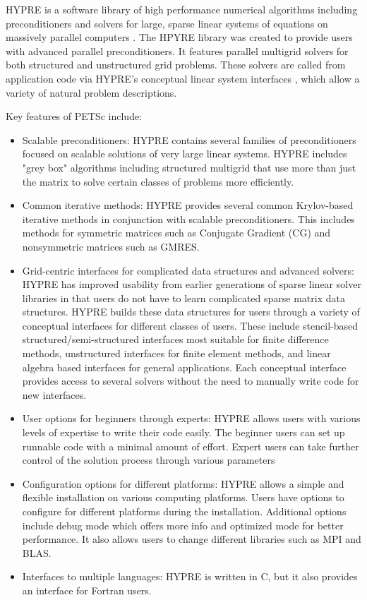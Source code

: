 HYPRE is a software library of high performance numerical algorithms including preconditioners and solvers for large, sparse linear systems of equations on massively parallel computers \cite{Falgout2006TheDA}. 
The HPYRE library was created to provide users with advanced parallel preconditioners. It features parallel multigrid solvers for both structured and unstructured grid problems.
These solvers are called from application code via HYPRE's conceptual linear system interfaces \cite{10.5555/1125403.1125423}, which allow a variety of natural problem descriptions.

Key features of PETSc include:
\begin{itemize}
    \item Scalable preconditioners: HYPRE contains several families of preconditioners focused on scalable solutions of very large linear systems.
    HYPRE includes "grey box" algorithms including structured multigrid that use more than just the matrix to solve certain classes of problems more efficiently.
    \item Common iterative methods: HYPRE provides several common Krylov-based iterative methods in conjunction with scalable preconditioners. 
    This includes methods for symmetric matrices such as Conjugate Gradient (CG) and nonsymmetric matrices such as GMRES.
    \item Grid-centric interfaces for complicated data structures and advanced solvers: HYPRE has improved usability from earlier generations of sparse linear solver libraries in that users do not have to learn complicated sparse matrix data structures.
    HYPRE builds these data structures for users through a variety of conceptual interfaces for different classes of users.
    These include stencil-based structured/semi-structured interfaces most suitable for finite difference methods, unstructured interfaces for finite element methods, and linear algebra based interfaces for general applications.
    Each conceptual interface provides access to several solvers without the need to manually write code for new interfaces.
    \item User options for beginners through experts: HYPRE allows users with various levels of expertise to write their code easily. The beginner users can set up runnable code with a minimal amount of effort. Expert users can take further control of the solution process through various parameters
    \item Configuration options for different platforms: HYPRE allows a simple and flexible installation on various computing platforms. Users have options to configure for different platforms during the installation.
    Additional options include debug mode which offers more info and optimized mode for better performance.
    It also allows users to change different libraries such as MPI and BLAS.
    \item Interfaces to multiple languages: HYPRE is written in C, but it also provides an interface for Fortran users.
\end{itemize}